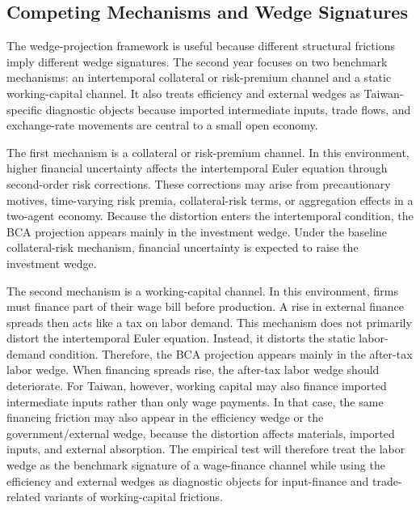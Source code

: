 \documentclass[12pt]{article}
\begin{document}
\subsection{Competing Mechanisms and Wedge Signatures}

The wedge-projection framework is useful because different structural frictions imply different
wedge signatures. The second year focuses on two benchmark mechanisms: an intertemporal
collateral or risk-premium channel and a static working-capital channel. It also treats efficiency
and external wedges as Taiwan-specific diagnostic objects because imported intermediate inputs,
trade flows, and exchange-rate movements are central to a small open economy.

The first mechanism is a collateral or risk-premium channel. In this environment, higher financial
uncertainty affects the intertemporal Euler equation through second-order risk corrections. These
corrections may arise from precautionary motives, time-varying risk premia, collateral-risk terms,
or aggregation effects in a two-agent economy. Because the distortion enters the intertemporal
condition, the BCA projection appears mainly in the investment wedge. Under the baseline
collateral-risk mechanism, financial uncertainty is expected to raise the investment wedge.

The second mechanism is a working-capital channel. In this environment, firms must finance part
of their wage bill before production. A rise in external finance spreads then acts like a tax on labor
demand. This mechanism does not primarily distort the intertemporal Euler equation. Instead, it
distorts the static labor-demand condition. Therefore, the BCA projection appears mainly in the
after-tax labor wedge. When financing spreads rise, the after-tax labor wedge should deteriorate.
For Taiwan, however, working capital may also finance imported intermediate inputs rather than
only wage payments. In that case, the same financing friction may also appear in the efficiency
wedge or the government/external wedge, because the distortion affects materials, imported
inputs, and external absorption. The empirical test will therefore treat the labor wedge as the
benchmark signature of a wage-finance channel while using the efficiency and external wedges
as diagnostic objects for input-finance and trade-related variants of working-capital frictions.
\end{document}
